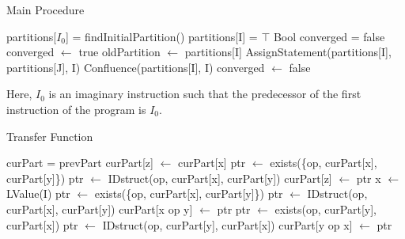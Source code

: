 \begin{algorithm}
\caption{Main Procedure}\label{MainProcedure}
\begin{algorithmic}[1]
    \State partitions[$I_0$] = findInitialPartition()
    \State
        \State partitions[I] = $\top$
    \EndFor
    \State
    \State Bool converged = false
        \State converged $\gets$ true
        \State
            \State oldPartition $\gets$ partitions[I]
            \State
                \State AssignStatement(partitions[I], partitions[J], I)
            \Else
                \State Confluence(partitions[I], I)
            \EndIf
            \State
                \State converged $\gets$ false
            \EndIf
        \EndFor
    \EndWhile
\EndProcedure
\end{algorithmic}
\end{algorithm}

Here, $I_0$ is an imaginary instruction such that the predecessor of the first instruction of the program is $I_0$.

\begin{algorithm}
\caption{Transfer Function}\label{AssignStatement}
\begin{algorithmic}[1]
    \State curPart = prevPart
    \State
        \State curPart[z] $\gets$ curPart[x]
        \State ptr $\gets$ exists(\{op, curPart[x], curPart[y]\})
            \State ptr $\gets$ IDstruct(op, curPart[x], curPart[y])
        \EndIf
        \State
        curPart[z] $\gets$ ptr
    \EndIf
    \State
    \State x $\gets$ LValue(I)
            \State ptr $\gets$ exists(\{op, curPart[x], curPart[y]\})
                \State ptr $\gets$ IDstruct(op, curPart[x], curPart[y])
            \EndIf
            \State curPart[x op y] $\gets$ ptr
            \State
            \State ptr $\gets$ exists(op, curPart[y], curPart[x])
                \State ptr $\gets$ IDstruct(op, curPart[y], curPart[x])
            \EndIf
            \State curPart[y op x] $\gets$ ptr
        \EndFor
    \EndFor
\EndProcedure
\end{algorithmic}
\end{algorithm}


